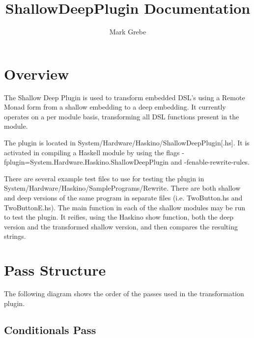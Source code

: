 \documentclass[11pt, oneside]{article}   	%
\title{ShallowDeepPlugin Documentation}
\author{Mark Grebe}
\begin{document}
\maketitle

\section{Overview}

The Shallow Deep Plugin is used to transform embedded DSL's using a
Remote Monad form from a shallow embedding to a deep embedding.
It currently operates on a per module basis, transforming all DSL
functions present in the module.

The plugin is located in System/Hardware/Haskino/ShallowDeepPlugin[.hs].
It is activated in compiling a Haskell module by using the flags \break
-fplugin=System.Hardware.Haskino.ShallowDeepPlugin and 
-fenable-rewrite-rules.

There are several example test files to use for testing the plugin in \break
System/Hardware/Haskino/SamplePrograms/Rewrite.  There are both
shallow and deep versions of the same program in separate files (i.e. 
TwoButton.hs and TwoButtonE.hs).  The main function in each of the
shallow modules may be run to test the plugin.  It reifies, using the
Haskino show function, both the deep version and the transformed
shallow version, and then compares the resulting strings.

\section{Pass Structure}

The following diagram shows the order of the passes used in the transformation
plugin.


\subsection{Conditionals Pass}
\end{document}
